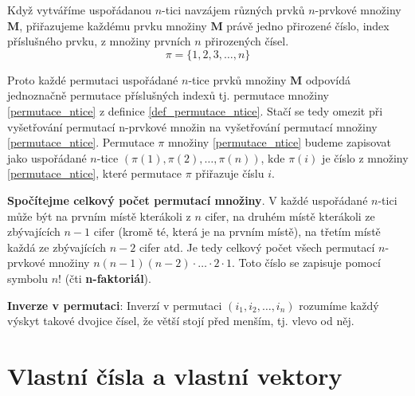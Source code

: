       \begin{definition}\label{def_permutace_ntice}
        Když vytváříme uspořádanou \(n\)-tici navzájem různých prvků \(n\)-prv\-ko\-vé množiny 
        \(\mathbf{M}\), přiřazujeme každému prvku množiny \(\mathbf{M}\) právě jedno přirozené 
        číslo, index příslušného prvku, z množiny prvních \(n\) přirozených čísel.
        \begin{equation}\label{permutace_ntice}
          \pi = \lbrace 1, 2, 3, \ldots, n\rbrace
        \end{equation}
      \end{definition}
  
      Proto každé permutaci uspořádané \(n\)-tice prvků množiny \(\mathbf{M}\) odpovídá jednoznačně 
      permutace příslušných indexů tj. permutace množiny \ref{permutace_ntice} z definice 
      \ref{def_permutace_ntice}. Stačí se tedy omezit při vyšetřování permutací n-prvkové množin 
      na vyšetřování permutací množiny \ref{permutace_ntice}. Permutace \(\pi\) množiny 
      \ref{permutace_ntice} budeme zapisovat jako uspořádané \(n\)-tice \(\left(\pi(1), \pi(2) 
      ,\ldots, \pi(n)\right)\), kde \(\pi(i)\) je číslo z množiny \ref{permutace_ntice}, které 
      permutace \(\pi\) přiřazuje číslu \(i\).

      \begin{example}\label{ex_celk_pocet_permutaci}
        \textbf{Spočítejme celkový počet permutací množiny}. V každé uspořádané \(n\)-tici může být 
        na prvním místě kterákoli z \(n\) cifer, na druhém místě kterákoli ze zbývajících \(n-1\) 
        cifer (kromě té, která je na prvním místě), na  třetím místě každá ze zbývajících \(n-2\) 
        cifer atd. Je tedy celkový počet všech permutací \(n\)-prvkové množiny \(n(n-1)(n-2)\cdot 
        \ldots \cdot2\cdot1\). Toto číslo se zapisuje pomocí symbolu \(n!\) (čti 
        \textbf{n-faktoriál}).
      \end{example}
      
      \begin{definition}\label{def_inv_perm}\textbf{Inverze v permutaci}:
        Inverzí v permutaci \(\left(i_1,i_2,…,i_n \right)\) rozumíme každý výskyt takové dvojice 
        čísel, že větší stojí před menším, tj. vlevo od něj.
      \end{definition}  
   
  \section{Vlastní čísla a vlastní vektory}
